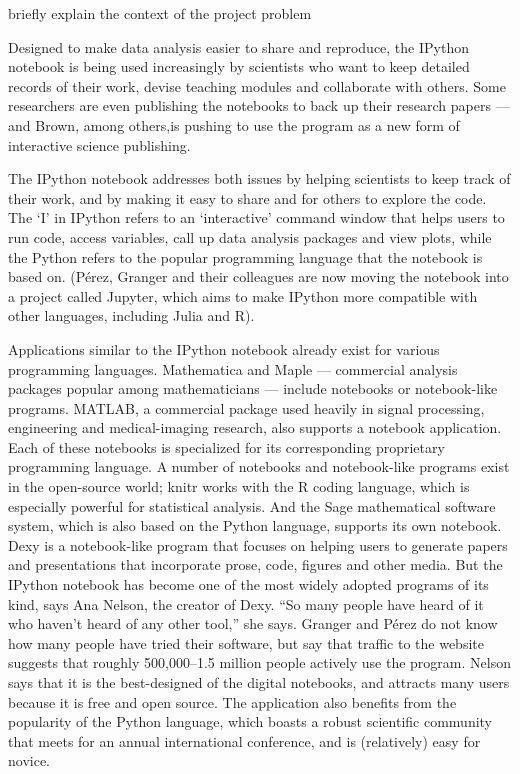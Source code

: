briefly explain the context of the project problem

Designed to make data analysis easier to share and reproduce, the IPython notebook is being used increasingly by scientists who want to keep detailed records of their work, devise teaching modules and collaborate with others. Some researchers are even publishing the notebooks to back up their research papers — and Brown, among others,is pushing to use the program as a new form of interactive science publishing. \cite{shen2014interactive}

The IPython notebook addresses both issues
by helping scientists to keep track of their work,
and by making it easy to share and for others
to explore the code. The ‘I’ in IPython refers to
an ‘interactive’ command window that helps
users to run code, access variables, call up data
analysis packages and view plots, while the
Python refers to the popular programming
language that the notebook is based on. (Pérez,
Granger and their colleagues are now moving
the notebook into a project called Jupyter, which
aims to make IPython more compatible with
other languages, including Julia and R).

Applications similar to the IPython notebook
already exist for various programming
languages. Mathematica and Maple — commercial
analysis packages popular among mathematicians
— include notebooks or notebook-like
programs. MATLAB, a commercial package
used heavily in signal processing, engineering
and medical-imaging research, also supports a
notebook application. Each of these notebooks
is specialized for its corresponding proprietary
programming language.
A number of notebooks and notebook-like
programs exist in the open-source world; knitr
works with the R coding language, which is
especially powerful for statistical analysis. And
the Sage mathematical software system, which
is also based on the Python language, supports
its own notebook. Dexy is a notebook-like program
that focuses on helping users to generate
papers and presentations that incorporate prose,
code, figures and other media.
But the IPython notebook has become one
of the most widely adopted programs of its
kind, says Ana Nelson, the creator of Dexy. “So
many people have heard of it who haven’t heard
of any other tool,” she says. Granger and Pérez
do not know how many people have tried their
software, but say that traffic to the website suggests
that roughly 500,000–1.5 million people
actively use the program. Nelson says that it is
the best-designed of the digital notebooks, and
attracts many users because it is free and open
source. The application also benefits from the
popularity of the Python language, which boasts
a robust scientific community that meets for an
annual international conference, and is (relatively)
easy for novice.